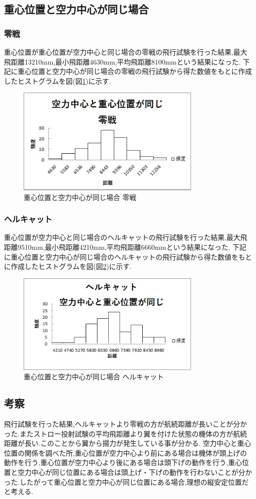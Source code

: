\subsection{重心位置と空力中心が同じ場合}

\subsubsection{零戦}
重心位置が重心位置が空力中心と同じ場合の零戦の飛行試験を行った結果,最大飛距離13210mm,最小飛距離4630mm,平均飛距離8100mmという結果になった.
下記に重心位置と空力中心が同じ場合の零戦の飛行試験から得た数値をもとに作成したヒストグラムを図(図\ref{fig:zo})に示す.

\begin{figure}[htbp]
  \begin{center}
    \includegraphics[width=90mm]{zo.JPG}
    \end{center}
  \caption{重心位置と空力中心が同じ場合 零戦}
 \label{fig:zo}
\end{figure}

\subsubsection{ヘルキャット}
重心位置が空力中心と同じ場合のヘルキャットの飛行試験を行った結果,最大飛距離9510mm,最小飛距離4210mm,平均飛距離6660mmという結果になった.
下記に重心位置と空力中心が同じ場合のヘルキャットの飛行試験から得た数値をもとに作成したヒストグラムを図(図\ref{fig:go})に示す.

\begin{figure}[htbp]
  \begin{center}
    \includegraphics[width=90mm]{go.JPG}
    \end{center}
  \caption{重心位置と空力中心が同じ場合 ヘルキャット}
 \label{fig:go}
\end{figure}

\subsection{考察}
飛行試験を行った結果,ヘルキャットより零戦の方が航続距離が長いことが分かった.またストロー投射試験の平均飛距離より翼を付けた状態の機体の方が航続距離が長い.このことから翼から揚力が発生している事が分かる.
空力中心と重心位置の関係を調べた所,重心位置が空力中心より前にある場合は機体が頭上げの動作を行う,重心位置が空力中心より後にある場合は頭下げの動作を行う,重心位置と空力中心が同じ位置にある場合は頭上げ・下げの動作を行わないことが分かった.したがって重心位置と空力中心が同じ位置にある場合,理想の縦安定位置だと考える.